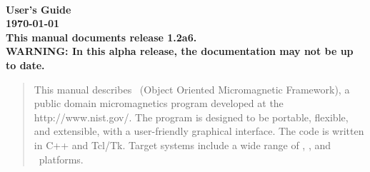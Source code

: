 
\usepackage{l2hbugs}

%
%
%
\usepackage{tocloft}
\newlength{\oommftocsslen}
\setlength{\oommftocsslen}{0.5em} %
\renewcommand{\cftsubsecpresnum}{\hfill} %
\renewcommand{\cftsubsecaftersnum}{\hspace*{\oommftocsslen}}
\addtolength{\cftsubsecnumwidth}{\oommftocsslen}
%
%




\nocite{*}  %


\begin{titlepage}
\label{page:contents}
\par
\vspace*{\fill}
\begin{center}
\Large\bf
\OOMMF\\
User's Guide\\[2ex]
\large
{\today}
{}\\[2ex]
This manual documents release 1.2a6.\\[1ex]
WARNING: In this alpha release, the
documentation may not be up to date.

\end{center}
\vspace{10\baselineskip}
\begin{abstract}
This manual describes \OOMMF\ (Object Oriented Micromagnetic Framework),
a public domain micromagnetics program developed at the
{http://www.nist.gov/}.  The program is designed
to be portable, flexible, and extensible, with a user-friendly graphical
interface.  The code is written in C++ and Tcl/Tk. Target systems
include a wide range of \Unix, \Windows, and \MacOSX\ platforms.
\end{abstract}
\vspace*{\fill}
\par
\end{titlepage}

